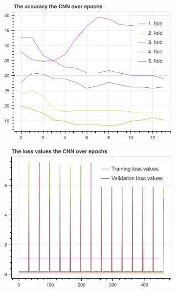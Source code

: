 		\begin{figure}[H]\ContinuedFloat
			\begin{subfigure}[b]{0.49\textwidth}
				\centering
				\includegraphics[width=\textwidth]{img/CNN-accuracy.png}
			\end{subfigure}
			\hfill
			\begin{subfigure}[b]{0.49\textwidth}
				\centering
				\includegraphics[width=\textwidth]{img/CNN-loss_values.png}
			\end{subfigure}
			\hfill
			\begin{subfigure}[b]{0.49\textwidth}

\end{subfigure}
\end{figure}
